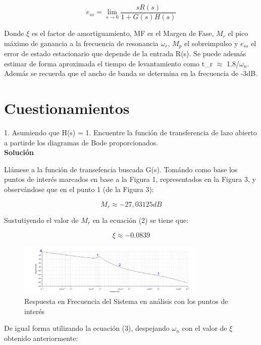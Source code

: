 \documentclass[12pt,letterpaper]{article}
\begin{document}
\begin{equation}
    e_{ss}= \lim_{s \to 0} \frac{sR(s)}{1+G(s)H(s)}
\end{equation}


Donde $\xi$ es el factor de amortiguamiento, MF es el Margen de Fase, $M_r$ el pico máximo de ganancia a la frecuencia de resonancia $\omega_r$, $M_p$ el sobreimpulso y $e_{ss}$ el error de estado estacionario que depende de la entrada R(s). Se puede además estimar de forma aproximada el tiempo de levantamiento como t_r $\approx$ 1.8/$\omega_n$. Además se recuerda que el ancho de banda se determina en la frecuencia de -3dB.

\section{Cuestionamientos}
1. Asumiendo que H(s) = 1. Encuentre la función de transferencia de lazo abierto a partirde los diagramas de Bode proporcionados.\\

\textbf{Solución}

Llámese a la función de transefencia buscada G(s). Tomándo como base los puntos de interés marcados en base a la Figura 1, representados en la Figura 3, y observándose que en el punto 1 (de la Figura 3):

\begin{equation*}
    M_r \approx -27,03125 dB
\end{equation*}


Sustutiyendo el valor de $M_r$ en la ecuación (2) se tiene que:

\begin{equation*}
    \xi \approx -0.0839
\end{equation*}

\begin{figure}
  \centering
    \includegraphics[width=0.8\textwidth]{diag3.jpg}
  \caption{Respuesta en Frecuencia del Sistema en análisis con los puntos de interés}
  \label{fig:ejemplo}
\end{figure}


De igual forma utilizando la ecuación (3), despejando $\omega_n$ con el valor de $\xi$ obtenido anteriormente:
\end{document}
